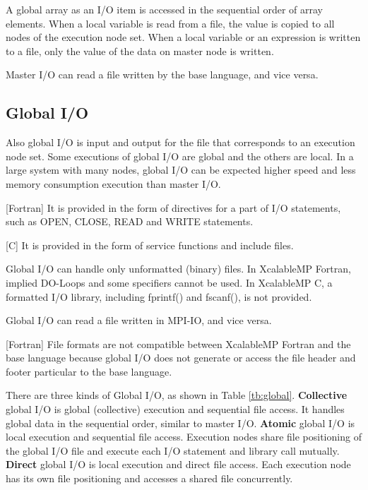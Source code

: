   A global array as an I/O item is accessed in the sequential order of
  array elements.
  When a local variable is read from a file, the value is copied to all
  nodes of the execution node set.
  When a local variable or an expression is written to a file, only the
  value of the data on master node is written.
  
  Master I/O can read a file written by the base language, and vice
  versa.
  

  \subsection{Global I/O}

  Also global I/O is input and output for the file that corresponds to
  an execution node set.
  Some executions of global I/O are global and the others are local.
  In a large system with many nodes, global I/O can be expected higher
  speed and less memory consumption execution than master I/O.

  [Fortran] It is provided in the form of directives for a part of I/O
  statements, such as OPEN, CLOSE, READ
  and WRITE statements.

  [C] It is provided in the form of service functions and include files.

  Global I/O can handle only unformatted (binary) files. In XcalableMP Fortran,
  implied DO-Loops and some specifiers cannot be used.
  In XcalableMP C, a formatted I/O library, including fprintf() and fscanf(), is not provided.

  Global I/O can read a file written in MPI-IO, and vice versa. 

  [Fortran] File formats are not compatible between XcalableMP Fortran
  and the base language because global I/O does not generate or access
  the file header and footer particular to the base language.

  There are three kinds of Global I/O, as shown in Table
  \ref{tb:global}.
  {\bf Collective} global I/O is global (collective) execution and
  sequential file access.
  It handles global data in the sequential order, similar to master
  I/O.
  {\bf Atomic} global I/O is local execution and sequential file access.
  Execution nodes share file positioning of the global I/O file and
  execute each I/O statement and library call mutually.
  {\bf Direct} global I/O is local execution and direct file access.
  Each execution node has its own file positioning and accesses a shared
  file concurrently.

